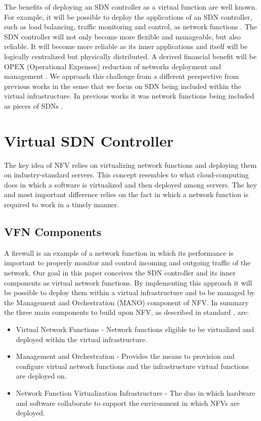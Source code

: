 \documentclass[sigconf]{Template}
\begin{document}
The benefits of deploying an SDN controller as a virtual function are well known. For example, it will be possible to deploy the applications of an SDN controller, such as load balancing, traffic monitoring and control, as network functions \cite{mijumbi2016_NFV_stateofart}. The SDN controller will not only become more flexible and manageable, but also reliable. It will become more reliable as its inner applications and itself will be logically centralized but physically distributed. A derived financial benefit will be OPEX (Operational Expenses) reduction of networks deployment and management \cite{mijumbi2016_NFV_stateofart}. 
We approach this challenge from a different perspective from previous works in the sense that we focus on SDN being included within the virtual infrastructure. In previous works it was network functions being included as pieces of SDNs \cite{gember2014opennf}.
\section{Virtual SDN Controller}\label{NFV_Fundamentals}

The key idea of NFV relies on virtualizing network functions and deploying them on industry-standard servers. This concept resembles to what cloud-computing does in which a software is virtualized and then deployed among servers. The key and most important difference relies on the fact in which a network function is required to work in a timely manner. 
\newpage
\subsection{VFN Components}
A firewall is an example of a network function in which its performance is important to properly monitor and control incoming and outgoing traffic of the network. Our goal in this paper conceives the SDN controller and its inner components as virtual network functions. By implementing this approach it will be possible to deploy them within a virtual infrastructure and to be managed by the Management and Orchestration (MANO) component of NFV. In summary the three main components to build upon NFV, as described in standard \cite{nfv2014etsi}, are:
\begin{itemize}
	\item Virtual Network Functions - Network functions eligible to be virtualized and deployed within the virtual infrastructure.
	\item Management and Orchestration - Provides the means to provision and configure virtual network functions and the infrastructure virtual functions are deployed on.
	\item Network Function Virtualization Infrastructure - The duo in which hardware and software collaborate to support the environment in which NFVs are deployed.
	
\end{itemize}
\end{document}
